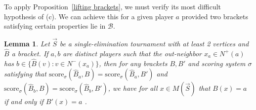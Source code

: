 \documentclass[12pt,letterpaper]{article}
\newtheorem{lem}[thm]{Lemma}
\theoremstyle{definition}
\newcommand{\sig}{\sigma}
\renewcommand{\1}{\mathbbm{1}}
\renewcommand{\c}[1]{\mathcal{#1}}
\newcommand{\score}{\mathrm{score}}
\newcommand{\tour}{\vec{S}}
\begin{document}
To apply Proposition~\ref{lifting brackets}, we must verify its most difficult hypothesis of (c).  We can achieve this for a given player $a$ provided two brackets satisfying certain properties lie in $\c{B}$.

\begin{lem}\label{favorite team}
	Let $\tour$ be a single-elimination tournament with at least 2 vertices and $\widehat{B}$ a bracket.  If $a,b$ are distinct players such that the out-neighbor $x_a\in N^+(a)$ has $b\in \{\widehat{B}(v):v\in N^-(x_a)\}$, then for any brackets $B,B'$ and scoring system $\sig$ satisfying that $\score_\sig(\widehat{B}_a,B)=\score_\sig(\widehat{B}_a,B')$ and $\score_\sig(\widehat{B}_b,B)=\score_\sig(\widehat{B}_b,B')$, we have for all $x\in M(\tour)$ that $B(x)=a$ if and only if $B'(x)=a$ .
\end{lem}
\end{document}
